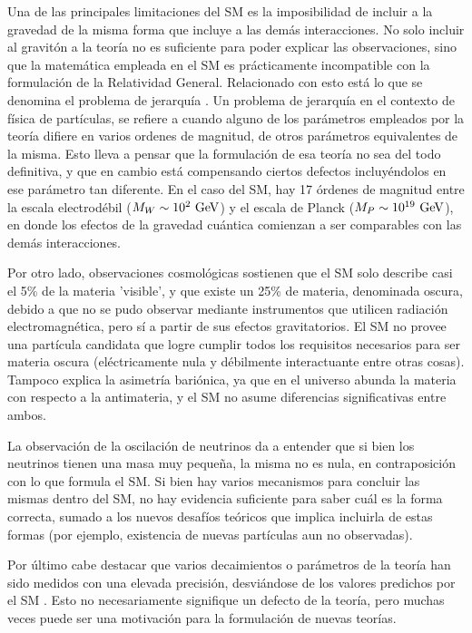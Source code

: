 Una de las principales limitaciones del SM es la imposibilidad de incluir a la gravedad de la misma forma que incluye a las demás interacciones. No solo incluir al gravitón a la teoría no es suficiente para poder explicar las observaciones, sino que la matemática empleada en el SM es prácticamente incompatible con la formulación de la Relatividad General. Relacionado con esto está lo que se denomina el problema de jerarquía \cite{hierarchy}. Un problema de jerarquía en el contexto de física de partículas, se refiere a cuando alguno de los parámetros empleados por la teoría difiere en varios ordenes de magnitud, de otros parámetros equivalentes de la misma. Esto lleva a pensar que la formulación de esa teoría no sea del todo definitiva, y que en cambio está compensando ciertos defectos incluyéndolos en ese parámetro tan diferente. En el caso del SM, hay 17 órdenes de magnitud entre la escala electrodébil ($M_W\sim 10^{2}\ \text{GeV}$) y el escala de Planck ($M_P\sim 10^{19}\ \gev$), en donde los efectos de la gravedad cuántica comienzan a ser comparables con las demás interacciones.

Por otro lado, observaciones cosmológicas sostienen que el SM solo describe casi el 5\% de la materia 'visible', y que existe un 25\% de materia, denominada oscura, debido a que no se pudo observar mediante instrumentos que utilicen radiación electromagnética, pero sí a partir de sus efectos gravitatorios. El SM no provee una partícula candidata que logre cumplir todos los requisitos necesarios para ser materia oscura (eléctricamente nula y débilmente interactuante entre otras cosas). Tampoco explica la asimetría bariónica, ya que en el universo abunda la materia con respecto a la antimateria, y el SM no asume diferencias significativas entre ambos.

La observación de la oscilación de neutrinos da a entender que si bien los neutrinos tienen una masa muy pequeña, la misma no es nula, en contraposición con lo que formula el SM. Si bien hay varios mecanismos para concluir las mismas dentro del SM, no hay evidencia suficiente para saber cuál es la forma correcta, sumado a los nuevos desafíos teóricos que implica incluirla de estas formas (por ejemplo, existencia de nuevas partículas aun no observadas).

Por último cabe destacar que varios decaimientos o parámetros de la teoría han sido medidos con una elevada precisión, desviándose de los valores predichos por el SM . Esto no necesariamente signifique un defecto de la teoría, pero muchas veces puede ser una motivación para la formulación de nuevas teorías.

